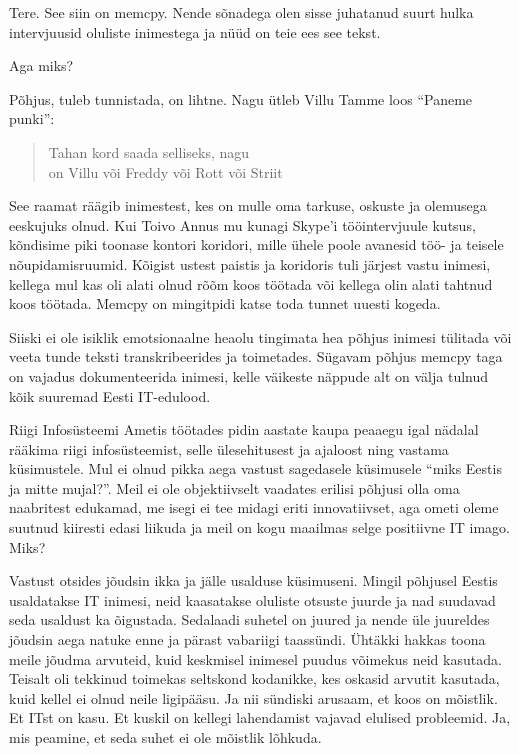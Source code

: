 Tere. See siin on memcpy. Nende sõnadega olen sisse juhatanud suurt hulka 
intervjuusid oluliste inimestega ja nüüd on teie ees see tekst. 

Aga miks? 

Põhjus, tuleb tunnistada, on lihtne. Nagu ütleb Villu Tamme loos 
\enquote{Paneme punki}:

\begin{verse}
Tahan kord saada selliseks, nagu \\
on Villu või Freddy või Rott või Striit\\
\end{verse}

See raamat räägib inimestest, kes on mulle oma tarkuse, oskuste ja olemusega 
eeskujuks olnud. Kui Toivo Annus mu kunagi Skype'i 
tööintervjuule kutsus, kõndisime piki toonase kontori koridori, mille ühele 
poole avanesid töö- ja teisele nõupidamisruumid. Kõigist ustest paistis ja 
koridoris tuli järjest vastu inimesi, kellega mul kas oli alati olnud rõõm koos 
töötada või kellega olin alati tahtnud koos töötada. Memcpy on mingitpidi 
katse toda tunnet uuesti kogeda.

Siiski ei ole isiklik emotsionaalne heaolu tingimata hea põhjus inimesi 
tülitada või veeta tunde teksti transkribeerides ja toimetades. Sügavam põhjus 
memcpy taga on vajadus dokumenteerida inimesi, kelle 
väikeste näppude alt on välja tulnud kõik suuremad Eesti IT-edulood. 

Riigi Infosüsteemi Ametis töötades pidin aastate 
kaupa peaaegu igal nädalal rääkima riigi infosüsteemist, selle ülesehitusest ja 
ajaloost ning vastama küsimustele. Mul ei olnud pikka aega vastust sagedasele 
küsimusele \enquote{miks Eestis ja mitte mujal?}. Meil ei ole objektiivselt 
vaadates erilisi põhjusi olla oma naabritest edukamad, me isegi ei tee midagi 
eriti innovatiivset, aga ometi oleme suutnud kiiresti edasi liikuda ja meil on 
kogu maailmas selge positiivne IT imago. Miks? 

Vastust otsides jõudsin ikka ja jälle usalduse küsimuseni. Mingil põhjusel Eestis usaldatakse 
IT inimesi, neid kaasatakse oluliste otsuste juurde ja nad suudavad 
seda usaldust ka õigustada. Sedalaadi suhetel on juured ja nende üle 
juureldes jõudsin aega natuke enne ja pärast vabariigi taassündi. Ühtäkki 
hakkas toona meile jõudma arvuteid, kuid keskmisel inimesel puudus võimekus 
neid kasutada. Teisalt oli tekkinud toimekas seltskond kodanikke, kes oskasid 
arvutit kasutada, kuid kellel ei olnud neile ligipääsu. Ja nii sündiski 
arusaam, et koos on mõistlik. Et ITst on kasu. Et kuskil on kellegi 
lahendamist vajavad elulised probleemid. Ja, mis peamine, et seda suhet ei ole 
mõistlik lõhkuda. 

